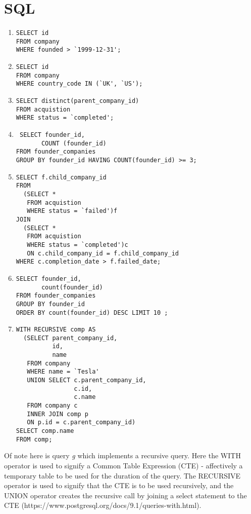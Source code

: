 \documentclass[12pt]{article}
\begin{document}
\section{SQL}
\begin{enumerate}

 \item\label{part1}\begin{verbatim}SELECT id
FROM company
WHERE founded > `1999-12-31';\end{verbatim}

  \item\label{part1}\begin{verbatim}SELECT id
FROM company
WHERE country_code IN (`UK', `US');\end{verbatim}
  \item\label{part1}\begin{verbatim}SELECT distinct(parent_company_id)
FROM acquistion
WHERE status = `completed';\end{verbatim}
  \item\label{part1}\begin{verbatim} SELECT founder_id,
       COUNT (founder_id)
FROM founder_companies
GROUP BY founder_id HAVING COUNT(founder_id) >= 3;\end{verbatim}
  \item\label{part1}\begin{verbatim}SELECT f.child_company_id
FROM
  (SELECT *
   FROM acquistion
   WHERE status = `failed')f
JOIN
  (SELECT *
   FROM acquistion
   WHERE status = `completed')c
   ON c.child_company_id = f.child_company_id
WHERE c.completion_date > f.failed_date;\end{verbatim}
  \item\label{part1}\begin{verbatim}SELECT founder_id,
       count(founder_id)
FROM founder_companies
GROUP BY founder_id
ORDER BY count(founder_id) DESC LIMIT 10 ;\end{verbatim}
  \item\label{part1}\begin{verbatim}WITH RECURSIVE comp AS
  (SELECT parent_company_id,
          id,
          name
   FROM company
   WHERE name = `Tesla'
   UNION SELECT c.parent_company_id,
                c.id,
                c.name
   FROM company c
   INNER JOIN comp p
   ON p.id = c.parent_company_id)
SELECT comp.name
FROM comp;\end{verbatim}
\end{enumerate}

Of note here is query \emph{g} which implements a recursive query. Here the WITH operator is used to signify a Common Table Expression (CTE) - affectively a temporary table to be used for the duration of the query. The RECURSIVE operator is used to signify that the CTE is to be used recursively, and the UNION operator creates the recursive call by joining a select statement to the CTE (https://www.postgresql.org/docs/9.1/queries-with.html).
\end{document}
